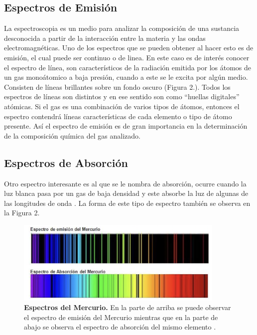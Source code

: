 \documentclass[DIV=calc, paper=a4, fontsize=11pt]{scrartcl}
\begin{document}
\subsection*{\textcolor{carmine}{Espectros de Emisión}}
La espectroscopia es un medio para analizar la composición de una sustancia desconocida a partir de la interacción entre la materia y las ondas electromagnéticas\cite{beiser}. Uno de los espectros que se pueden obtener al hacer esto es de emisión, el cual puede ser continuo o de linea. En este caso es de interés conocer el espectro de línea, son característicos de la radiación emitida por los átomos de un gas monoátomico a baja presión, cuando a este se le excita por algún medio. Consisten de líneas brillantes sobre un fondo oscuro (Figura 2.). Todos los espectros de líneas son distintos y en ese sentido son como “huellas digitales” atómicas. Si el gas es una combinación de varios tipos de átomos, entonces el espectro contendrá líneas características de cada elemento o tipo de átomo presente. Así el espectro de emisión es de gran importancia en la determinación de la composición química del gas analizado. \cite{Libro}
\subsection*{\textcolor{carmine}{Espectros de Absorción}}
Otro espectro interesante es al que se le nombra de absorción, ocurre cuando la luz blanca pasa por un gas de baja densidad y este absorbe la luz de algunas de las longitudes de onda \cite{beiser}. La forma de este tipo de espectro también se observa en la Figura 2.
\begin{figure}[H]
    \centering
    \includegraphics[width=10cm]{fotos/Captura de Pantalla 2022-05-11 a la(s) 17.46.02.png}
    \caption{\textbf{Espectros del Mercurio.} En la parte de arriba se puede observar el espectro de emisión del Mercurio mientras que en la parte de abajo se observa el espectro de absorción del mismo elemento \cite{Libro}.}
    \label{fig:my_label}
\end{figure}
\end{document}
